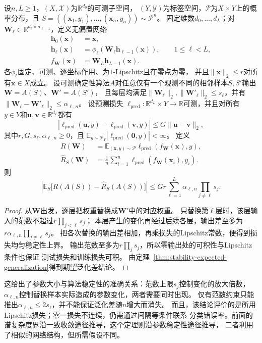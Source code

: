 \begin{theorem}[分层参数稳定性与期望泛化差]
\label{thm:layerwise-parameter-stability}
设$n,L\geq1$，$(X,\mathcal X)$为$\mathbb R^{d_0}$的可测子空间，
$(Y,\mathcal Y)$为标签空间，$\mathcal P$为$X\times Y$上的概率分布，且
$S=((\bm x_1,y_1),\ldots,(\bm x_n,y_n))\sim\mathcal P^n$。
固定维数$d_0,\ldots,d_L$；对
$\bm W_\ell\in\mathbb R^{d_\ell\times d_{\ell-1}}$，定义无偏置网络
\[
\begin{aligned}
 \bm h_0(\bm x)&=\bm x,\\
 \bm h_\ell(\bm x)
 &=\phi_\ell(\bm W_\ell\bm h_{\ell-1}(\bm x)),
 \qquad 1\leq\ell<L,\\
 f_{\bm W}(\bm x)&=\bm W_L\bm h_{L-1}(\bm x).
\end{aligned}
\]
各$\phi_\ell$固定、可测、逐坐标作用、为$1$-Lipschitz且在零点为零，
并且$\|\bm x\|_2\leq r$对所有$\bm x\in X$成立。
设可测确定性算法$A$对任意仅有一个观测不同的相邻样本$S,S'$输出
$\bm W=A(S)$、$\bm W'=A(S')$，
且每层均满足$\|\bm W_\ell\|_2,\|\bm W'_\ell\|_2\leq s_\ell$，并有
$\|\bm W_\ell-\bm W'_\ell\|_2\leq\alpha_{\ell,n}$。
设预测损失
$\ell_{\mathrm{pred}}:\mathbb R^{d_L}\times Y\to\mathbb R$可测，并且对所有
$y\in Y$和$\bm u,\bm v\in\mathbb R^{d_L}$都有
\[
 |\ell_{\mathrm{pred}}(\bm u,y)-\ell_{\mathrm{pred}}(\bm v,y)|
 \leq G\|\bm u-\bm v\|_2,
\]
其中$r,G,s_\ell,\alpha_{\ell,n}\geq0$，且
$\mathbb E_{y\sim\mathcal P_Y}|\ell_{\mathrm{pred}}(\bm 0,y)|<\infty$。
定义
\[
\begin{aligned}
 R(\bm W)
 &=\mathbb E_{(\bm x,y)\sim\mathcal P}
   \ell_{\mathrm{pred}}(f_{\bm W}(\bm x),y),\\
 \hat R_S(\bm W)
 &=\frac1n\sum_{i=1}^n
   \ell_{\mathrm{pred}}(f_{\bm W}(\bm x_i),y_i).
\end{aligned}
\]
则
\[
 \left|\mathbb E_S\bigl[R(A(S))-\hat R_S(A(S))\bigr]\right|
 \leq Gr\sum_{\ell=1}^L\alpha_{\ell,n}\prod_{j\ne\ell}s_j.
\]
\end{theorem}
\begin{proof}
从$\bm W$出发，逐层把权重替换成$\bm W'$中的对应权重。
只替换第$\ell$层时，该层输入的范数不超过$r\prod_{j<\ell}s_j$；
本层产生的变化再经过后续各层，输出差至多为
$r\alpha_{\ell,n}\prod_{j\ne\ell}s_j$。
把各次替换的输出差相加，再乘损失的Lipschitz常数，便得到损失均匀稳定性上界。
输出范数至多为$r\prod_j s_j$，所以零输出处的可积性与Lipschitz条件也保证
测试损失和训练损失可积。
由定理~\ref{thm:stability-expected-generalization}得到期望泛化差结论。
\end{proof}

这给出了参数大小与算法稳定性的准确关系：范数上限$s_j$控制变化的放大倍数，
$\alpha_{\ell,n}$控制替换样本实际造成的参数变化，两者需要同时出现。
仅有范数约束只能推出$\alpha_{\ell,n}\leq2s_\ell$，并不能保证泛化差随$n$增大而消失。
而且，该结论评价的是所用Lipschitz损失；零一损失不连续，仍需通过间隔等条件联系
分类错误率。前面的谱复杂度界沿一致收敛途径推导，这个定理则沿参数稳定性途径推导，
二者利用了相似的网络结构，但所需假设不同。

